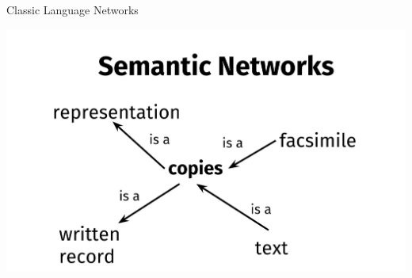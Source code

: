 \documentclass[10pt,xcolor=table]{beamer}
\begin{document}
\begin{frame}{Classic Language Networks}
\begin{overprint}
	  \centering
	  \includegraphics[width=.7\linewidth]{image2/Chapitre2/sem_network_ex.pdf}   

\end{overprint}



%	
%

\end{frame}
\end{document}
